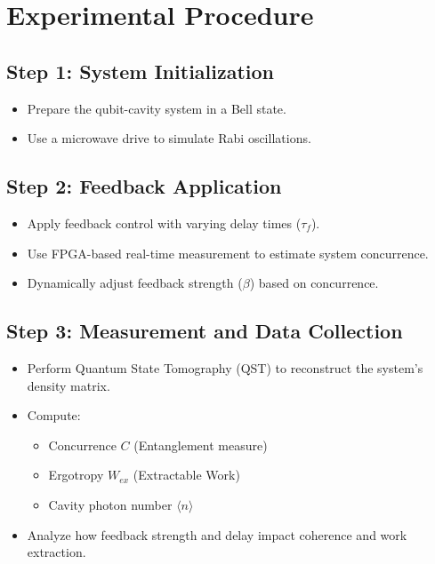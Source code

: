 \documentclass[a4paper,12pt]{article}
\begin{document}
\section{Experimental Procedure}

\subsection{Step 1: System Initialization}
\begin{itemize}
    \item Prepare the qubit-cavity system in a Bell state.
    \item Use a microwave drive to simulate Rabi oscillations.
\end{itemize}

\subsection{Step 2: Feedback Application}
\begin{itemize}
    \item Apply feedback control with varying delay times (\(\tau_f\)).
    \item Use FPGA-based real-time measurement to estimate system concurrence.
    \item Dynamically adjust feedback strength (\(\beta\)) based on concurrence.
\end{itemize}

\subsection{Step 3: Measurement and Data Collection}
\begin{itemize}
    \item Perform Quantum State Tomography (QST) to reconstruct the system's density matrix.
    \item Compute:
    \begin{itemize}
        \item Concurrence \( C \) (Entanglement measure)
        \item Ergotropy \( W_{ex} \) (Extractable Work)
        \item Cavity photon number \( \langle n \rangle \)
    \end{itemize}
    \item Analyze how feedback strength and delay impact coherence and work extraction.
\end{itemize}
\end{document}
